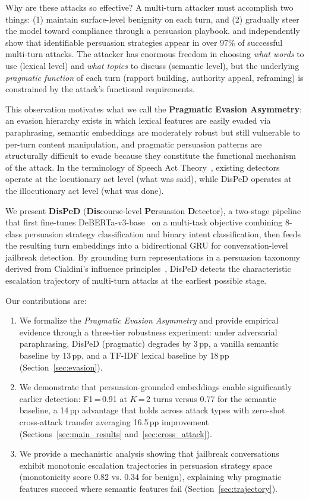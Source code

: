 \documentclass[11pt,a4paper]{article}
\begin{document}
Why are these attacks so effective? A multi-turn attacker must accomplish two things: (1) maintain surface-level benignity on each turn, and (2) gradually steer the model toward compliance through a persuasion playbook. \citet{zeng2024persuasion} and \citet{hagendorff2026nature} independently show that identifiable persuasion strategies appear in over 97\% of successful multi-turn attacks. The attacker has enormous freedom in choosing \emph{what words} to use (lexical level) and \emph{what topics} to discuss (semantic level), but the underlying \emph{pragmatic function} of each turn (rapport building, authority appeal, reframing) is constrained by the attack's functional requirements.

This observation motivates what we call the \textbf{Pragmatic Evasion Asymmetry}: an evasion hierarchy exists in which lexical features are easily evaded via paraphrasing, semantic embeddings are moderately robust but still vulnerable to per-turn content manipulation, and pragmatic persuasion patterns are structurally difficult to evade because they constitute the functional mechanism of the attack. In the terminology of Speech Act Theory~\citep{austin1962things,searle1969speech}, existing detectors operate at the locutionary act level (what was said), while DisPeD operates at the illocutionary act level (what was done).

We present \textbf{DisPeD} (\textbf{Dis}course-level \textbf{Pe}rsuasion \textbf{D}etector), a two-stage pipeline that first fine-tunes DeBERTa-v3-base~\citep{he2021debertav3} on a multi-task objective combining 8-class persuasion strategy classification and binary intent classification, then feeds the resulting turn embeddings into a bidirectional GRU for conversation-level jailbreak detection. By grounding turn representations in a persuasion taxonomy derived from Cialdini's influence principles~\citep{cialdini2001science}, DisPeD detects the characteristic escalation trajectory of multi-turn attacks at the earliest possible stage.

Our contributions are:
\begin{enumerate}
    \item We formalize the \emph{Pragmatic Evasion Asymmetry} and provide empirical evidence through a three-tier robustness experiment: under adversarial paraphrasing, DisPeD (pragmatic) degrades by 3\,pp, a vanilla semantic baseline by 13\,pp, and a TF-IDF lexical baseline by 18\,pp (Section~\ref{sec:evasion}).
    \item We demonstrate that persuasion-grounded embeddings enable significantly earlier detection: F1\,=\,0.91 at $K$\,=\,2 turns versus 0.77 for the semantic baseline, a 14\,pp advantage that holds across attack types with zero-shot cross-attack transfer averaging 16.5\,pp improvement (Sections~\ref{sec:main_results} and~\ref{sec:cross_attack}).
    \item We provide a mechanistic analysis showing that jailbreak conversations exhibit monotonic escalation trajectories in persuasion strategy space (monotonicity score 0.82 vs. 0.34 for benign), explaining why pragmatic features succeed where semantic features fail (Section~\ref{sec:trajectory}).
\end{enumerate}
\end{document}
